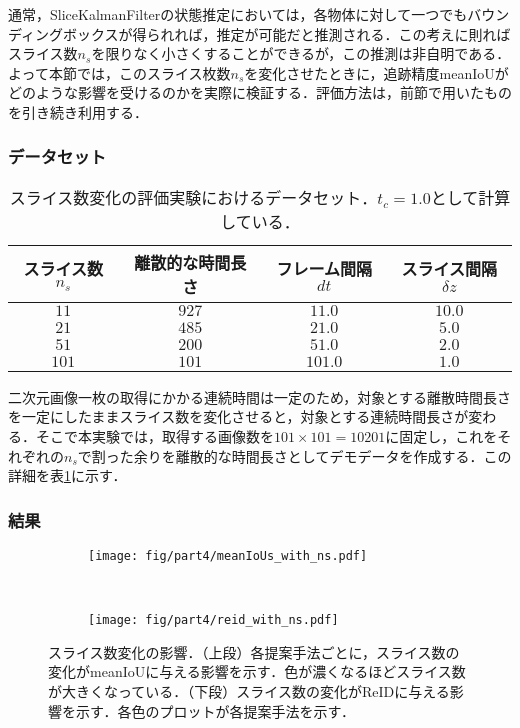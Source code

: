 通常，SliceKalmanFilterの状態推定においては，各物体に対して一つでもバウンディングボックスが得られれば，推定が可能だと推測される．この考えに則ればスライス数$n_s$を限りなく小さくすることができるが，この推測は非自明である．よって本節では，このスライス枚数$n_s$を変化させたときに，追跡精度meanIoUがどのような影響を受けるのかを実際に検証する．評価方法は，前節で用いたものを引き続き利用する．

    \subsubsection{データセット}

    \begin{table}[t]
        \centering
        \caption[スライス数変化の評価実験におけるデータセット]{スライス数変化の評価実験におけるデータセット．$t_c = 1.0$として計算している．}
        \label{tab:ns_exp_detail}
        \begin{tabular}{c|ccc}
            スライス数$n_s$ & 離散的な時間長さ & フレーム間隔$dt$ & スライス間隔$\delta z$ 
            \\ \hline \hline
            $11$ & $927$ & $11.0$ & $10.0$
            \\ $21$ & $485$ & $21.0$ & $5.0$
            \\ $51$ & $200$ & $51.0$ & $2.0$
            \\ $101$ & $101$ & $101.0$ & $1.0$
        \end{tabular}
    \end{table}

    二次元画像一枚の取得にかかる連続時間は一定のため，対象とする離散時間長さを一定にしたままスライス数を変化させると，対象とする連続時間長さが変わる．そこで本実験では，取得する画像数を$101 \times 101 = 10201$に固定し，これをそれぞれの$n_s$で割った余りを離散的な時間長さとしてデモデータを作成する．この詳細を表\ref{tab:ns_exp_detail}に示す．

    \subsubsection{結果}

    \begin{figure}[t]
        \begin{subfigure}[t]{\linewidth}
            \centering
            \texttt{[image: fig/part4/meanIoUs\_with\_ns.pdf]}
        \end{subfigure}
        \\
        \begin{subfigure}[t]{\linewidth}
            \centering
            \texttt{[image: fig/part4/reid\_with\_ns.pdf]}
        \end{subfigure}
        \caption[スライス数変化の影響]{スライス数変化の影響．（上段）各提案手法ごとに，スライス数の変化がmeanIoUに与える影響を示す．色が濃くなるほどスライス数が大きくなっている．（下段）スライス数の変化がReIDに与える影響を示す．各色のプロットが各提案手法を示す．}
        \label{fig:ns_effect}
    \end{figure}

